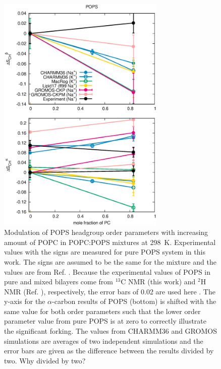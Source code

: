 \documentclass[aps,prl,superscriptaddress,twocolumn]{revtex4}
\begin{document}
\begin{figure}[!tb]
  \centering
  \includegraphics[width=8.0cm]{../Figs/HGorderparametersPSvsPC.eps}
  \caption{\label{HGorderparametersPSvsPC}
    Modulation of POPS headgroup order parameters with increasing amount of POPC in POPC:POPS mixtures at 298~K.
    Experimental values with the signs are measured for pure POPS system in this work.
    The signs are assumed to be the same for the mixture and the values are from Ref. .
    Because the experimental values of POPS in pure and mixed bilayers come from $^{13}$C NMR (this work) and $^2$H NMR (Ref. ), respectively,
    the error bars of 0.02 are used here \cite{botan15,ollila16}.
    The y-axis for the $\alpha$-carbon results of POPS (bottom) is shifted
    with the same value for both order parameters such that the lower order
    parameter value from pure POPS is at zero to correctly illustrate the significant forking.
    The values from CHARMM36 and GROMOS simulations are averages of two independent simulations and
    the error bars are given as the difference between the results divided by two. {\color{red} Why divided by two?}
  }
\end{figure}
\end{document}
